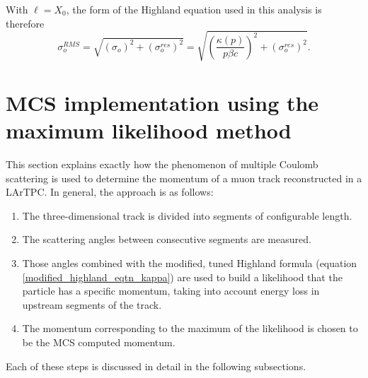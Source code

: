 \documentclass[a4paper,11pt]{article}
\begin{document}
With ${\ell} = X_0$, the form of the Highland equation used in this analysis is therefore
\begin{equation}\label{modified_highland_eqtn_kappa}
\sigma_{o}^{RMS} = \sqrt{ (\sigma_o)^2 + (\sigma_o^{res})^2} = \sqrt{ (\frac{\kappa(p)}{p\beta c})^2 + (\sigma_o^{res})^2 }.
\end{equation}












\section{MCS implementation using the maximum likelihood method}\label{MCS_technique_section}

This section explains exactly how the phenomenon of multiple Coulomb scattering is used to determine the momentum of a muon track reconstructed in a LArTPC. In general, the approach is as follows:
\begin{enumerate}
\item The three-dimensional track is divided into segments of configurable length.
\item The scattering angles between consecutive segments are measured.
\item Those angles combined with the modified, tuned Highland formula (equation \ref{modified_highland_eqtn_kappa}) are used to build a likelihood that the particle has a specific momentum, taking into account energy loss in upstream segments of the track.
\item The momentum corresponding to the maximum of the likelihood is chosen to be the MCS computed momentum.
\end{enumerate}
Each of these steps is discussed in detail in the following subsections.\\

\end{document}

